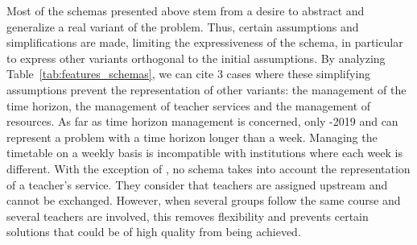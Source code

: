 Most of the schemas presented above stem from a desire to abstract and generalize a real variant of the problem. Thus, certain assumptions and simplifications are made, limiting the expressiveness of the schema, in particular to express other variants orthogonal to the initial assumptions. By analyzing Table~\ref{tab:features_schemas}, we can cite 3 cases where these simplifying assumptions prevent the representation of other variants: the management of the time horizon, the management of teacher services and the management of resources.  
As far as time horizon management is concerned, only \ITC{}-2019 and \UTP{} can represent a problem with a time horizon longer than a week. Managing the timetable on a weekly basis is incompatible with institutions where each week is different. %
With the exception of \UTP{}, no schema takes into account the representation of a teacher's service. They consider that teachers are assigned upstream and cannot be exchanged. However, when several groups follow the same course and several teachers are involved, this removes flexibility and prevents certain solutions that could be of high quality from being achieved.
